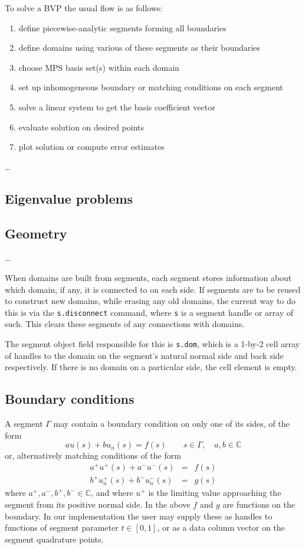 \documentclass[12pt]{article}
\newcommand{\ben}{\begin{enumerate}}
\newcommand{\een}{\end{enumerate}}
\newcommand{\bea}{\begin{eqnarray}}
\newcommand{\eea}{\end{eqnarray}}
\begin{document}
To solve a BVP the usual flow is as follows:

\ben
\item define piecewise-analytic segments forming all boundaries
\item define domains using various of these segments as their boundaries
\item choose MPS basis set(s) within each domain
\item set up inhomogeneous boundary or matching conditions on each segment
\item solve a %
linear system to get the basis coefficient vector
\item evaluate solution on desired points
\item plot solution or compute error estimates
\een

\ldots

\subsection{Eigenvalue problems}




\subsection{Geometry}

\ldots

When domains are built from segments, each segment stores information about
which domain, if any, it is connected to on each side.
If segments are to be reused to construct new domains, while erasing any
old domains, the current way to do this is via the {\tt s.disconnect}
command, where {\tt s} is a segment handle or array of such. This clears
these segments of any connections with domains.

The segment object field responsible for
this is {\tt s.dom}, which is a 1-by-2 cell array
of handles to the domain on the segment's natural normal side and
back side respectively. If there is no domain on a particular side, the
cell element is empty.


\subsection{Boundary conditions}

A segment $\Gamma$ may contain a boundary condition on only one of its sides,
of the form
$$
a u(s) + b u_n(s) = f(s)  \qquad s\in\Gamma, \quad a,b \in \mathbb{C}
$$
or, alternatively matching conditions of the form
\bea
a^+ u^+(s) + a^- u^-(s) &=& f(s)\\
b^+ u_n^+(s) + b^- u_n^-(s) &=& g(s)
\eea
where $a^+,a^-,b^+,b^- \in \mathbb{C}$, and where $u^+$ is the
limiting value approaching the segment from its positive normal side.
In the above $f$ and $g$ are functions on the boundary.
In our implementation the user
may supply these as handles to functions of segment parameter
$t\in[0,1]$, or as a data column vector on the segment quadrature points.
\end{document}
